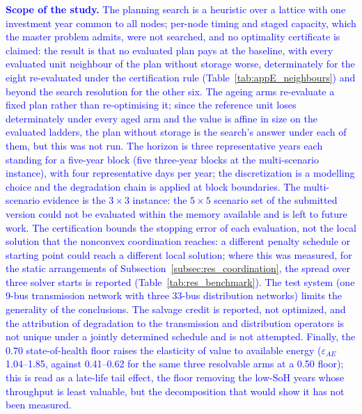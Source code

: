 \documentclass[preprint,12pt]{elsarticle}
\begin{document}
\textcolor{blue}{
    \textbf{Scope of the study.} The planning search is a heuristic over a lattice with one investment year common to all nodes; per-node timing and staged capacity, which the master problem admits, were not searched, and no optimality certificate is claimed: the result is that no evaluated plan pays at the baseline, with every evaluated unit neighbour of the plan without storage worse, determinately for the eight re-evaluated under the certification rule (Table~\ref{tab:appE_neighbours}) and beyond the search resolution for the other six. The ageing arms re-evaluate a fixed plan rather than re-optimising it; since the reference unit loses determinately under every aged arm and the value is affine in size on the evaluated ladders, the plan without storage is the search's answer under each of them, but this was not run. The horizon is three representative years each standing for a five-year block (five three-year blocks at the multi-scenario instance), with four representative days per year; the discretization is a modelling choice and the degradation chain is applied at block boundaries. 
    The multi-scenario evidence is the $3 \times 3$ instance: the $5 \times 5$ scenario set of the submitted version could not be evaluated within the memory available and is left to future work. The certification bounds the stopping error of each evaluation, not the local solution that the nonconvex coordination reaches: a different penalty schedule or starting point could reach a different local solution; where this was measured, for the static arrangements of Subsection~\ref{subsec:res_coordination}, the spread over three solver starts is reported (Table~\ref{tab:res_benchmark}).
    The test system (one 9-bus transmission network with three 33-bus distribution networks) limits the generality of the conclusions. The salvage credit is reported, not optimized, and the attribution of degradation to the transmission and distribution operators is not unique under a jointly determined schedule and is not attempted. Finally, the 0.70 state-of-health floor raises the elasticity of value to available energy ($\varepsilon_{AE}$ 1.04--1.85, against 0.41--0.62 for the same three resolvable arms at a 0.50 floor); this is read as a late-life tail effect, the floor removing the low-SoH years whose throughput is least valuable, but the decomposition that would show it has not been measured.
}

\end{document}
